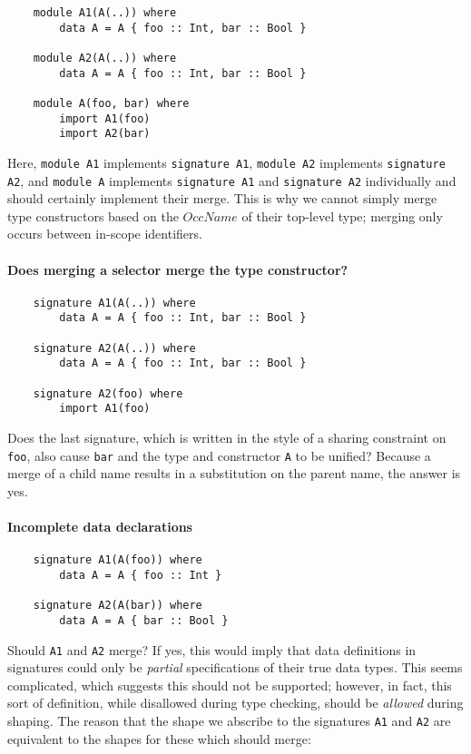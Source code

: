 \documentclass{article}
\newcommand{\I}[1]{\ensuremath{\mathit{#1}}}
\begin{document}
\begin{verbatim}
    module A1(A(..)) where
        data A = A { foo :: Int, bar :: Bool }

    module A2(A(..)) where
        data A = A { foo :: Int, bar :: Bool }

    module A(foo, bar) where
        import A1(foo)
        import A2(bar)
\end{verbatim}

Here, \verb|module A1| implements \verb|signature A1|, \verb|module A2| implements \verb|signature A2|,
and \verb|module A| implements \verb|signature A1| and \verb|signature A2| individually
and should certainly implement their merge.  This is why we cannot simply
merge type constructors based on the \I{OccName} of their top-level type;
merging only occurs between in-scope identifiers.

\paragraph{Does merging a selector merge the type constructor?}

\begin{verbatim}
    signature A1(A(..)) where
        data A = A { foo :: Int, bar :: Bool }

    signature A2(A(..)) where
        data A = A { foo :: Int, bar :: Bool }

    signature A2(foo) where
        import A1(foo)
\end{verbatim}
%
Does the last signature, which is written in the style of a sharing constraint on \verb|foo|,
also cause \verb|bar| and the type and constructor \verb|A| to be unified?
Because a merge of a child name results in a substitution on the parent name,
the answer is yes.

\paragraph{Incomplete data declarations}

\begin{verbatim}
    signature A1(A(foo)) where
        data A = A { foo :: Int }

    signature A2(A(bar)) where
        data A = A { bar :: Bool }
\end{verbatim}
%
Should \verb|A1| and \verb|A2| merge?  If yes, this would imply
that data definitions in signatures could only be \emph{partial}
specifications of their true data types.  This seems complicated,
which suggests this should not be supported; however, in fact,
this sort of definition, while disallowed during type checking,
should be \emph{allowed} during shaping. The reason that the
shape we abscribe to the signatures \verb|A1| and \verb|A2| are
equivalent to the shapes for these which should merge:
\end{document}
